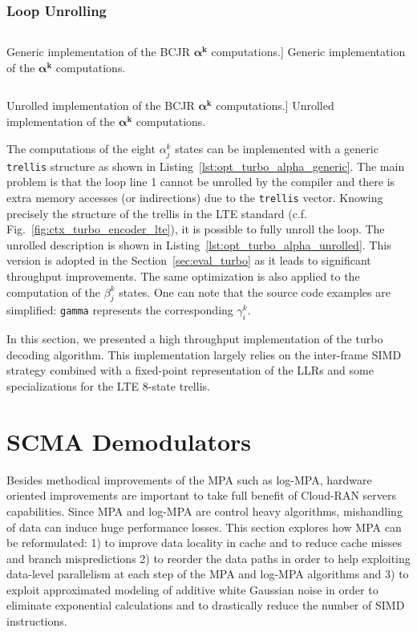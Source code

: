 \subsubsection{Loop Unrolling}

\begin{listing}[htp]
  \inputminted[frame=lines,linenos]{C++}{\curChapter/src/turbo/alpha_generic.cpp}
  \caption
    [Generic implementation of the BCJR $\bm{\alpha^k}$ computations.]
    {Generic implementation of the $\bm{\alpha^k}$ computations.}
  \label{lst:opt_turbo_alpha_generic}
\end{listing}

\begin{listing}[htp]
  \inputminted[frame=lines,linenos]{C++}{\curChapter/src/turbo/alpha_unrolled.cpp}
  \caption
    [Unrolled implementation of the BCJR $\bm{\alpha^k}$ computations.]
    {Unrolled implementation of the $\bm{\alpha^k}$ computations.}
  \label{lst:opt_turbo_alpha_unrolled}
\end{listing}

The computations of the eight $\alpha^k_j$ states can be implemented with
a generic \verb|trellis| structure as shown in
Listing~\ref{lst:opt_turbo_alpha_generic}. The main problem is that the loop
line 1 cannot be unrolled by the compiler and there is extra memory accesses (or
indirections) due to the \verb|trellis| vector. Knowing precisely the structure
of the trellis in the LTE standard (c.f. Fig.~\ref{fig:ctx_turbo_encoder_lte}),
it is possible to fully unroll the loop. The unrolled description is shown in
Listing~\ref{lst:opt_turbo_alpha_unrolled}. This version is adopted in
the Section~\ref{sec:eval_turbo} as it leads to significant throughput
improvements. The same optimization is also applied to the computation of the
$\beta^k_j$ states. One can note that the source code examples are simplified:
\verb|gamma| represents the corresponding $\gamma^k_i$.

In this section, we presented a high throughput implementation of the turbo
decoding algorithm. This implementation largely relies on the inter-frame SIMD
strategy combined with a fixed-point representation of the LLRs and some
specializations for the LTE 8-state trellis.

\section{SCMA Demodulators}
\label{sec:opt_scma}

Besides methodical improvements of the MPA such as log-MPA, hardware oriented
improvements are important to take full benefit of Cloud-RAN servers
capabilities. Since MPA and log-MPA are control heavy algorithms, mishandling of
data can induce huge performance losses. This section explores how MPA can be
reformulated: 1) to improve data locality in cache and to reduce cache misses
and branch mispredictions 2) to reorder the data paths in order to help
exploiting data-level parallelism at each step of the MPA and log-MPA algorithms
and 3) to exploit approximated modeling of additive white Gaussian noise in
order to eliminate exponential calculations and to drastically reduce the number
of SIMD instructions.

